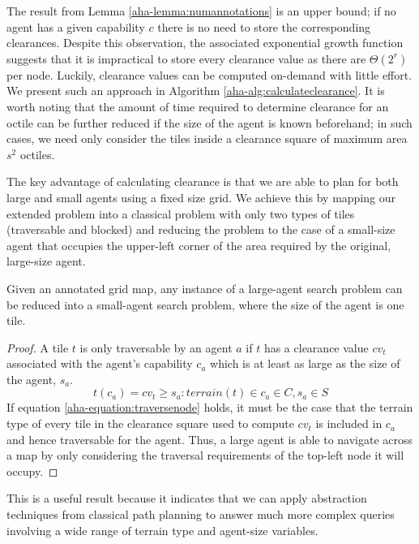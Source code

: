 The result from Lemma \ref{aha-lemma:numannotations} is an upper bound; if no agent has a given capability $c$ there is no need to store the corresponding clearances.
Despite this observation, the associated exponential growth function suggests that it is impractical to store every clearance value as there are $\Theta(2^r)$ per node.
Luckily, clearance values can be computed on-demand with little effort. 
We present such an approach in Algorithm \ref{aha-alg:calculateclearance}. 
It is worth noting that the amount of time required to determine clearance for an octile can be further reduced if the size of the agent is known beforehand; in such cases, we need only consider the tiles inside a clearance square of maximum area $s^2$ octiles.

\par \indent
The key advantage of calculating clearance is that we are able to plan for both large and small agents using a fixed size grid. 
We achieve this by mapping our extended problem into a classical problem with only two types of tiles (traversable and blocked) and reducing the problem to the case of a small-size agent that occupies the upper-left corner of the area required by the original, large-size agent. 
\begin{theorem}
\label{aha-theorem:reducibility}
Given an annotated grid map, any instance of a large-agent search problem can be reduced into a small-agent search problem, where the size of the agent is one tile.
\end{theorem}

\begin{proof}
A tile $t$ is only traversable by an agent $a$ if $t$ has a clearance value $cv_{t}$ associated with the agent's capability $c_{a}$ which is at least as large as the size of the agent, $s_{a}$. 
\begin{equation}
\label{aha-equation:traversenode}
t(c_{a}) = cv_{t} \geq s_{a} : terrain(t) \in c_{a} \in C, s_{a} \in S
\end{equation}
If equation \ref{aha-equation:traversenode} holds, it must be the case that the terrain type of every tile in the clearance square used to compute $cv_{t}$ is included in $c_{a}$ and hence traversable for the agent. 
Thus, a large agent is able to navigate across a map by only considering the traversal requirements of the top-left node it will occupy.
\end{proof}
This is a useful result because it indicates that we can apply abstraction techniques from classical path planning to answer much more complex queries involving a wide range of terrain type and agent-size variables.
